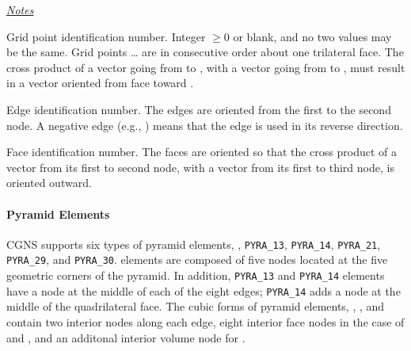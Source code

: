{{{\uline{\textit{Notes}}%
\begin{Ventryi}{}
   \item [\fort{N1,\ldots,N20}]
         Grid point identification number.
         Integer $\ge 0$ or blank, and no two values may be the same.
         Grid points \ldots{} are in consecutive order about
         one trilateral face.
         The cross product of a vector going from  to ,
         with a vector going from  to , must result in a
         vector oriented from face  toward .
   \item [\fort{E1,\ldots,E6}]
         Edge identification number.
         The edges are oriented from the first to the second node.
         A negative edge (e.g., ) means that the edge is used in
         its reverse direction.
   \item [\fort{F1,\ldots,F4}]
         Face identification number.
         The faces are oriented so that the cross product of a vector
         from its first to second node, with a vector from its first to
         third node, is oriented outward.
\end{Ventryi}

\paragraph{Pyramid Elements}
CGNS supports six types of pyramid elements, ,
\texttt{PYRA\_13}, \texttt{PYRA\_14}, \texttt{PYRA\_21}, \texttt{PYRA\_29}, and \texttt{PYRA\_30}.
 elements are composed of five nodes located at the
five geometric corners of the pyramid.
In addition, \texttt{PYRA\_13} and \texttt{PYRA\_14} elements have a node
at the middle of each of the eight edges; \texttt{PYRA\_14} adds a node
at the middle of the quadrilateral face.
The cubic forms of pyramid elements, ,
, and 
contain two interior nodes along each edge, eight interior face nodes
in the case of  and , and an additonal
interior volume node for .


}}}
